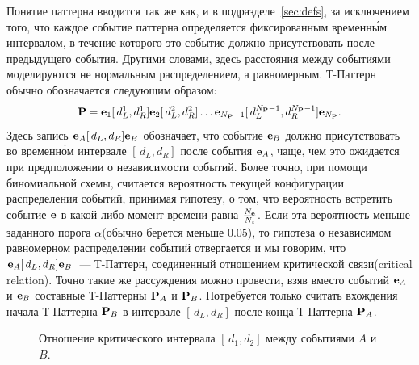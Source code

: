 \documentclass[12pt,fсeqn]{article}
\begin{document}
Понятие паттерна вводится так же как, и в подразделе~\ref{sec:defs}, за исключением того, что каждое событие паттерна 
определяется фиксированным временн\'{ы}м интервалом, в течение которого это событие должно присутствовать
после предыдущего события. Другими словами, здесь расстояния между событиями моделируются не нормальным распределением,
а равномерным. Т-Паттерн обычно обозначается следующим образом:
$${\bf P}={\bf e}_1[\,d^1_L, d^1_R]{\bf e}_2[\,d^2_L, d^2_R]\dots {\bf e}_{N_{{\bf P}}-1} [\,d^{N_{{\bf P}}-1}_L, d^{N_{{\bf P}}-1}_R] {\bf e}_{N_{{\bf P}}}.$$
Здесь запись ${\bf e}_A[\,d_L, d_R]{\bf e}_B$ обозначает, что событие ${\bf e}_B$ должно присутствовать 
во временн\'{о}м интервале $[\,d_L, d_R]$ после события ${\bf e}_A$, чаще, чем это ожидается при предположении 
о независимости событий. Более точно, при помощи биномиальной схемы, считается вероятность
текущей конфигурации распределения событий, принимая гипотезу, о том, что вероятность встретить событие 
${\bf e}$ в какой-либо момент времени равна $\frac{N_{{\bf e}}}{N_t}$. Если эта вероятность меньше заданного
порога $\alpha$(обычно берется меньше $0.05$), то гипотеза о независимом равномерном распределении
событий отвергается и мы говорим, что ${\bf e}_A[\,d_L, d_R]{\bf e}_B$~--- Т-Паттерн, соединенный отношением
критической связи(critical relation). 
Точно такие же рассуждения
можно провести, взяв вместо событий ${\bf e}_A$ и ${\bf e}_B$ составные Т-Паттерны ${\bf P}_A$ и ${\bf P}_B$. Потребуется
только считать вхождения начала Т-Паттерна ${\bf P}_B$ в интервале $[\,d_L, d_R]$ после конца Т-Паттерна ${\bf P}_A$. 

\begin{figure}[H]
\noindent{}
\caption{ Отношение критического интервала $[\,d_1, d_2]$ между событиями $A$ и $B$. }
\end{figure}
\end{document}
